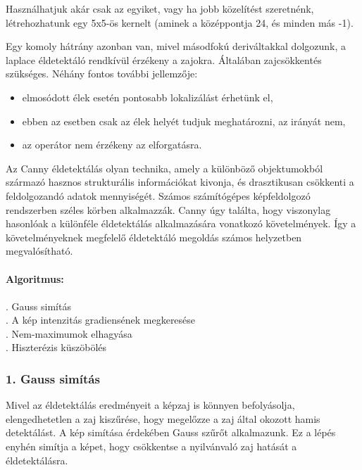 Használhatjuk akár csak az egyiket, vagy ha jobb közelítést szeretnénk, létrehozhatunk egy 5x5-ös kernelt (aminek a középpontja 24, és minden más -1).

Egy komoly hátrány azonban van, mivel másodfokú deriváltakkal dolgozunk, a laplace éldetektáló rendkívül érzékeny a zajokra. Általában zajcsökkentés szükséges. Néhány fontos további jellemzője:
\begin{itemize}
\item elmosódott élek esetén pontosabb lokalizálást érhetünk el,
\item ebben az esetben csak az élek helyét tudjuk meghatározni, az irányát nem,
\item az operátor nem érzékeny az elforgatásra.
\end{itemize}



Az Canny éldetektálás olyan technika, amely a különböző objektumokból származó hasznos strukturális információkat kivonja, és drasztikusan csökkenti a feldolgozandó adatok mennyiségét. Számos számítógépes képfeldolgozó rendszerben széles körben alkalmazzák. Canny úgy találta, hogy viszonylag hasonlóak a különféle éldetektálás alkalmazására vonatkozó követelmények. Így a követelményeknek megfelelő éldetektáló megoldás számos helyzetben megvalósítható. 
\\ \\
\textbf{Algoritmus:}\\ \\
. Gauss simítás\\
. A kép intenzitás gradiensének megkeresése\\
. Nem-maximumok elhagyása\\
. Hiszterézis küszöbölés \\ 

\subsubsection{1. Gauss simítás}

Mivel az éldetektálás eredményeit a képzaj is könnyen befolyásolja, elengedhetetlen a zaj kiszűrése, hogy megelőzze a zaj által okozott hamis detektálást. A kép simítása érdekében Gauss szűrőt alkalmazunk. Ez a lépés enyhén simítja a képet, hogy csökkentse a nyilvánvaló zaj hatását a éldetektálásra.

